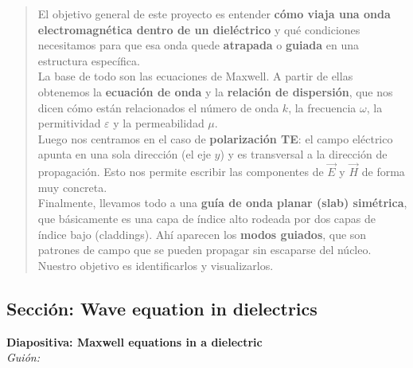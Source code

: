 \documentclass{article}
\begin{document}
\begin{quote}
El objetivo general de este proyecto es entender \textbf{cómo viaja una onda electromagnética dentro 
de un dieléctrico} y qué condiciones necesitamos para que esa onda quede \textbf{atrapada} o 
\textbf{guiada} en una estructura específica.\\[2mm]
La base de todo son las \textcolor{Apple Green}{ecuaciones de Maxwell}. A partir de ellas obtenemos 
la \textbf{ecuación de onda} y la \textbf{relación de dispersión}, que nos dicen cómo están 
relacionados el número de onda \(k\), la frecuencia \(\omega\), la permitividad \(\varepsilon\) 
y la permeabilidad \(\mu\).\\[2mm]
Luego nos centramos en el caso de \textbf{polarización TE}: el campo eléctrico apunta en una sola 
dirección (el eje \(y\)) y es transversal a la dirección de propagación. Esto nos permite escribir 
las componentes de \(\vec{E}\) y \(\vec{H}\) de forma muy concreta.\\[2mm]
Finalmente, llevamos todo a una \textbf{guía de onda planar (slab) simétrica}, que básicamente es 
una capa de índice alto rodeada por dos capas de índice bajo (\textcolor{Tarawera}{claddings}). 
Ahí aparecen los \textbf{modos guiados}, que son patrones de campo que se pueden propagar sin 
escaparse del núcleo. Nuestro objetivo es identificarlos y visualizarlos.
\end{quote}

\vspace{0.8cm}

\subsection*{Sección: Wave equation in dielectrics}

\noindent
\textbf{Diapositiva: Maxwell equations in a dielectric}\\[2mm]
\textit{Guión:}\\[2mm]
\end{document}
